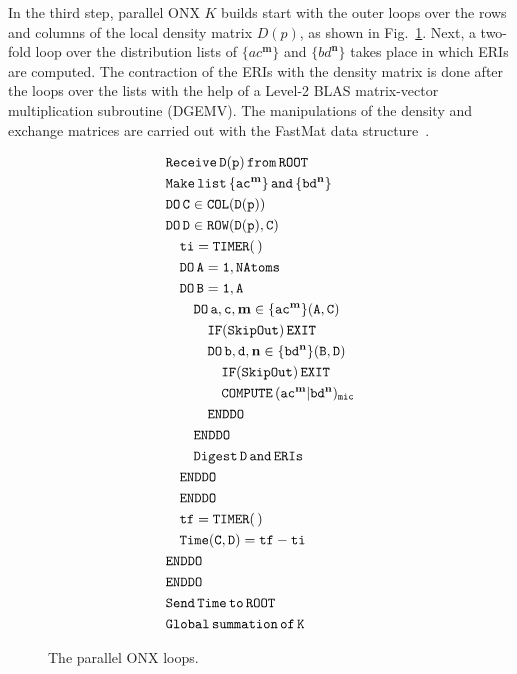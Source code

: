 \documentclass[prl,twocolumn,showpacs,twocolumngrid,superbib]{revtex4}
\begin{document}
In the third step, parallel ONX $K$ builds start with the outer loops over
the rows and columns of the local density matrix $D(p)$, 
as shown in Fig.~\ref{Fig:ONXcore}. Next, a two-fold loop over
the distribution lists of $\{ac^\mathbf{m}\}$ and $\{bd^\mathbf{n}\}$
takes place in which ERIs are computed. The contraction of 
the ERIs with the density matrix is done after the loops over the lists with the help of a 
Level-2 BLAS matrix-vector multiplication subroutine (DGEMV).
The manipulations of the density and exchange matrices are 
carried out with the FastMat data structure~\cite{CGan04B}.


\begin{figure}[htbp]
  \centering
  \caption{\protect
    The parallel ONX loops. 
  }\label{Fig:ONXcore}
  \begin{equation*}
    \begin{split}
      &\tt        Receive\,D(p)\,from\,ROOT\\
      &\tt        Make\,list\,\{ac^\mathbf{m}\}\,and\,\{bd^\mathbf{n}\} \\
      &\tt        DO\,C\in COL(D(p)) \\
      &\tt        DO\,D\in ROW(D(p),C) \\
      &\tt\quad     ti=TIMER(\,) \\
      &\tt\quad     DO\,A=1,NAtoms \\
      &\tt\quad     DO\,B=1,A \\
      &\tt\qquad      DO\,a,c,\mathbf{m}\in\{ac^\mathbf{m}\}(A,C) \\
      &\tt\qquad\quad   IF(SkipOut)\,EXIT  \\
      &\tt\qquad\quad   DO\,b,d,\mathbf{n}\in\{bd^\mathbf{n}\}(B,D) \\
      &\tt\qquad\qquad    IF(SkipOut)\,EXIT  \\
      &\tt\qquad\qquad    COMPUTE\,(ac^\mathbf{m}|bd^\mathbf{n})_{mic} \\
      &\tt\qquad\quad   ENDDO \\
      &\tt\qquad      ENDDO \\
      &\tt\qquad      Digest\,D\,and\,ERIs \\
      &\tt\quad     ENDDO \\
      &\tt\quad     ENDDO \\
      &\tt\quad     tf=TIMER(\,) \\
      &\tt\quad     Time(C,D)=tf-ti \\
      &\tt        ENDDO \\
      &\tt        ENDDO \\
      &\tt        Send\,Time\,to\,ROOT \\
      &\tt        Global\,summation\,of\,K 
    \end{split}
  \end{equation*}
\end{figure}
\end{document}

